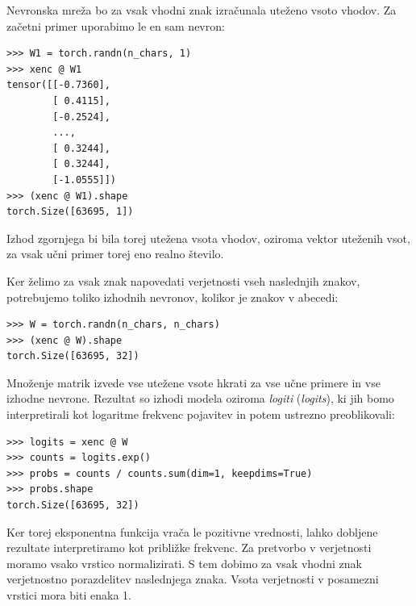 Nevronska mreža bo za vsak vhodni znak izračunala uteženo vsoto vhodov. Za začetni primer uporabimo le en sam nevron:
%
%
\vspace*{3mm}
\begin{lstlisting}
>>> W1 = torch.randn(n_chars, 1)
>>> xenc @ W1
tensor([[-0.7360],
        [ 0.4115],
        [-0.2524],
        ...,
        [ 0.3244],
        [ 0.3244],
        [-1.0555]])
>>> (xenc @ W1).shape
torch.Size([63695, 1])
\end{lstlisting}
Izhod zgornjega bi bila torej utežena vsota vhodov, oziroma vektor uteženih vsot, za vsak učni primer torej eno realno število.

Ker želimo za vsak znak napovedati verjetnosti vseh naslednjih znakov, potrebujemo toliko izhodnih nevronov, kolikor je znakov v abecedi:
%
\vspace*{3mm}
\begin{lstlisting}
>>> W = torch.randn(n_chars, n_chars)
>>> (xenc @ W).shape
torch.Size([63695, 32])
\end{lstlisting}
%
Množenje matrik izvede vse utežene vsote hkrati za vse učne primere in vse izhodne nevrone. Rezultat so izhodi modela oziroma \textit{logiti} (\textit{logits}), ki jih bomo interpretirali kot logaritme frekvenc pojavitev in potem ustrezno preoblikovali:
%
%
\vspace*{3mm}
\begin{lstlisting}
>>> logits = xenc @ W
>>> counts = logits.exp()
>>> probs = counts / counts.sum(dim=1, keepdims=True) 
>>> probs.shape
torch.Size([63695, 32])
\end{lstlisting}
%
Ker torej eksponentna funkcija vrača le pozitivne vrednosti, lahko dobljene rezultate interpretiramo kot približke frekvenc. Za pretvorbo v verjetnosti moramo vsako vrstico normalizirati. S tem dobimo za vsak vhodni znak verjetnostno porazdelitev naslednjega znaka. Vsota verjetnosti v posamezni vrstici mora biti enaka 1.
%

